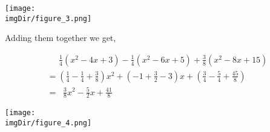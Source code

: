 \documentclass[MathsNotesBase.tex]{subfiles}
\begin{document}
{	
	\begin{center}
	\texttt{[image: \\imgDir/figure\_3.png]}
	\end{center}
	
	
	\begin{par}
	\begin{flushleft}
	Adding them together we get,
	\end{flushleft}
	\end{par}
	
	\begin{par}
	$$\begin{array}{lcr}
	\;\;\;\;\; \frac{1}{4}(x^2-4x+3) - \frac{1}{4}(x^2-6x+5) + \frac{3}{8}(x^2-8x+15) \\[8pt]
	= (\frac{1}{4}  - \frac{1}{4} + \frac{3}{8})x^2 + (-1 + \frac{3}{2} - 3)x + (\frac{3}{4} - \frac{5}{4} + \frac{45}{8}) \\[8pt]
	= \;\; \frac{3}{8}x^2 - \frac{5}{2}x + \frac{41}{8} 
	\end{array}$$
	\end{par}
	
	
	\begin{center}
	\texttt{[image: \\imgDir/figure\_4.png]}
	\end{center}

	\bigskip\bigskip
}
\end{document}
